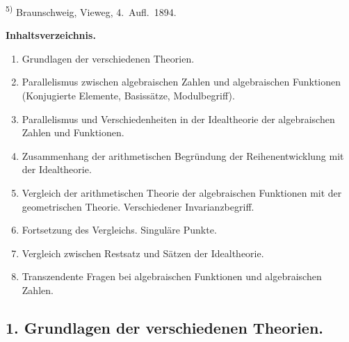 \documentclass[12pt,a4paper]{article}
\begin{document}
\smallskip
\noindent\textsuperscript{5)} Braunschweig, Vieweg, 4.\ Aufl.\ 1894.

\medskip

\textbf{Inhaltsverzeichnis.}
\begin{enumerate}
\item Grundlagen der verschiedenen Theorien.
\item Parallelismus zwischen algebraischen Zahlen und algebraischen Funktionen (Konjugierte Elemente, Basiss\"atze, Modulbegriff).
\item Parallelismus und Verschiedenheiten in der Idealtheorie der algebraischen Zahlen und Funktionen.
\item Zusammenhang der arithmetischen Begr\"undung der Reihenentwicklung mit der Idealtheorie.
\item Vergleich der arithmetischen Theorie der algebraischen Funktionen mit der geometrischen Theorie. Verschiedener Invarianzbegriff.
\item Fortsetzung des Vergleichs. Singul\"are Punkte.
\item Vergleich zwischen Restsatz und S\"atzen der Idealtheorie.
\item Transzendente Fragen bei algebraischen Funktionen und algebraischen Zahlen.
\end{enumerate}

\subsection*{1. Grundlagen der verschiedenen Theorien.}
\end{document}
